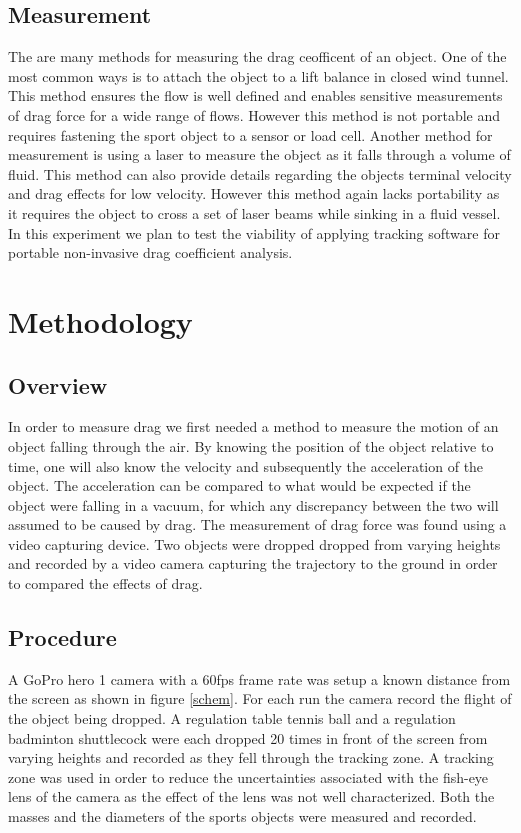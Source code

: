 \documentclass[paper=a4, fontsize=11pt, abstract=on]{scrartcl}
\numberwithin{equation}{section}		%
\numberwithin{figure}{section}			%
\numberwithin{table}{section}				%
\begin{document}
\subsection{Measurement}
The are many methods for measuring the drag ceofficent of an object. One of the most common ways is to attach the object to a lift balance in closed wind tunnel. This method ensures the flow is well defined and enables sensitive measurements of drag force for a wide range of flows\cite{p0}. However this method is not portable and requires fastening the sport object to a sensor or load cell. Another method for measurement is using a laser to measure the object as it falls through a volume of fluid. This method can also provide details regarding the objects terminal velocity and drag effects for low velocity. However this method again lacks portability as it requires the object to cross a set of laser beams while sinking in a fluid vessel\cite{p1}. In this experiment we plan to test the viability of applying tracking software for portable non-invasive drag coefficient analysis.

\section{Methodology}

\subsection{Overview}
In order to measure drag we first needed a method to measure the motion of an object falling through the air. By knowing the position of the object relative to time, one will also know the velocity and subsequently the acceleration of the object. The acceleration can be compared to what would be expected if the object were falling in a vacuum, for which any discrepancy between the two will assumed to be caused by drag. The measurement of drag force was found using a video capturing device. Two objects were dropped dropped from varying heights and recorded by a video camera capturing the trajectory to the ground in order to compared the effects of drag. 


  
\subsection{Procedure}
A GoPro hero 1 camera with a 60fps frame rate was setup a known distance from the screen as shown in figure \ref{schem}. For each run the camera record the flight of the object being dropped. A regulation table tennis ball and a regulation badminton shuttlecock were each dropped 20 times in front of the screen from varying heights and recorded as they fell through the tracking zone. A tracking zone was used in order to reduce the uncertainties associated with the fish-eye lens of the camera as the effect of the lens was not well characterized. Both the masses and the diameters of the sports objects were measured and recorded.
\end{document}
